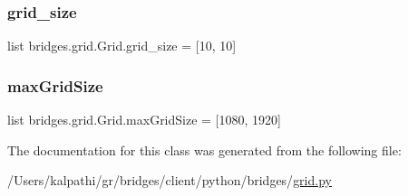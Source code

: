 \subsubsection{\texorpdfstring{grid\+\_\+size}{grid\_size}}
{\footnotesize\ttfamily list bridges.\+grid.\+Grid.\+grid\+\_\+size = \mbox{[}10, 10\mbox{]}\hspace{0.3cm}{\ttfamily [static]}}

\mbox{\label{classbridges_1_1grid_1_1_grid_a5585d466b6738e4eee71a7dda56b4153}} 
\subsubsection{\texorpdfstring{max\+Grid\+Size}{maxGridSize}}
{\footnotesize\ttfamily list bridges.\+grid.\+Grid.\+max\+Grid\+Size = \mbox{[}1080, 1920\mbox{]}\hspace{0.3cm}{\ttfamily [static]}}



The documentation for this class was generated from the following file\+:\begin{DoxyCompactItemize}
\item 
/\+Users/kalpathi/gr/bridges/client/python/bridges/\mbox{\hyperlink{grid_8py}{grid.\+py}}\end{DoxyCompactItemize}
